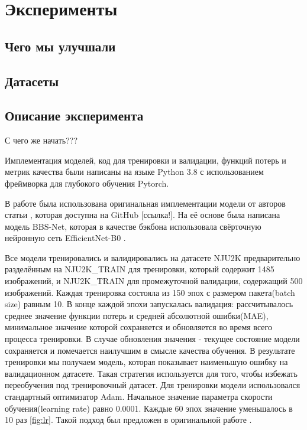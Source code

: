 \section{Эксперименты}

\subsection{Чего мы улучшали}

\subsection{Датасеты}

\subsection{Описание эксперимента}

С чего же начать???

Имплементация моделей, код для тренировки и валидации, функций потерь и метрик качества были написаны на языке Python 3.8
с использованием фреймворка для глубокого обучения Pytorch\cite{Pytorch}.

В работе была использована оригинальная имплементации модели от авторов статьи \cite{BBS}, которая доступна на GitHub [ссылка!].
На её основе была написана модель BBS-Net, которая в качестве бэкбона использовала свёрточную нейронную сеть EfficientNet-B0 \cite{Efficientnet}.



Все модели тренировались и валидировались на датасете NJU2K предварительно разделённым на NJU2K\_TRAIN для тренировки, 
который содержит 1485 изображений, и NJU2K\_TRAIN для промежуточной валидации, содержащий 500 изображений.
Каждая тренировка состояла из 150 эпох с размером пакета(batch size) равным 10. В конце каждой эпохи запускалась валидация: рассчитывалось среднее
значение функции потерь и средней абсолютной ошибки(MAE), минимальное значение которой сохраняется и обновляется во время
всего процесса тренировки. В случае обновления значения - текущее состояние модели сохраняется и помечается наилучшим в смысле качества обучения.
В результате тренировки мы получаем модель, которая показывает наименьшую ошибку на валидационном датасете. Такая стратегия используется для того,
чтобы избежать переобучения под тренировочный датасет. 
Для тренировки модели использовался стандартный оптимизатор Adam\cite{Adam}. Начальное значение параметра скорости обучения(learning rate) 
равно 0.0001. Каждые 60 эпох значение уменьшалось в 10 раз \ref{fig:lr}. Такой подход был предложен в оригинальной работе \cite{BBS}.


